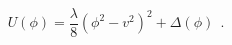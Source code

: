 \begin{equation}
U(\phi)=\frac{\lambda}{8}(\phi^2-v^2)^2 +\Delta(\phi) ~~.
\label{U.eqn2}
\end{equation}

